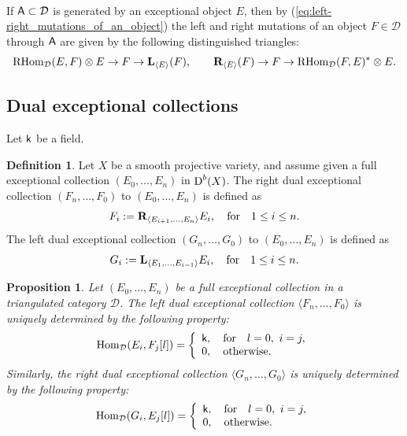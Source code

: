 \documentclass[sn-mathphys-num]{sn-jnl}%
\newcommand{\D}{\mathcal D}
\newcommand*{\Dd}{\mathop{\mathrm D\kern0pt}\nolimits}
\newcommand*{\Hom}{\mathop{\mathrm {Hom}}\nolimits}
\newcommand*{\RHom}{\mathop{\mathrm {RHom}}\nolimits}
\newcommand{\A}{{\sf A}}
\newcommand{\sk}{{\sf k}}
\newtheorem{proposition}[theorem]{Proposition}
\theoremstyle{definition}
\newtheorem{definition}[theorem]{Definition}%
\begin{document}
\

If $\A \subset \D$ is generated by an exceptional object $E$, then by 
 (\ref{eq:left-right_mutations_of_an_object}) the left and right mutations of an object $F\in \D$ through $\A$ are given by the following distinguished triangles:
\begin{equation}
\RHom_\D(E,F)\otimes E\rightarrow F\rightarrow {\bf L}_{\langle E\rangle}(F), \qquad 
{\bf R}_{\langle E\rangle}(F)\rightarrow F\rightarrow \RHom_\D(F,E)^{\ast}\otimes E .
\end{equation}
\subsection{Dual exceptional collections}\label{subsec:dualFEC}
Let $\sk$ be a field.
\begin{definition}\label{def:left-right_dual_exceptional_collections}
Let $X$ be a smooth projective variety, and assume given a full exceptional collection $(E_0,\dots,E_n)$ in $\Dd ^{b}(X)$. The right dual exceptional collection $(F_n,\dots, F_0)$ to $(E_0,\dots,E_n)$ is defined as 
\begin{equation}
F_i: = {\bf R}_{\langle E_{i+1},\dots,E_{n} \rangle}E_i, \quad {\rm for} \quad 1\leq i\leq n.
\end{equation}
The left dual exceptional collection $(G_n,\dots, G_0)$ to $(E_0,\dots,E_n)$ is defined as 
\begin{equation}
G_i: = {\bf L}_{\langle E_{1},\dots,E_{i-1} \rangle}E_i, \quad {\rm for} \quad 1\leq i\leq n.
\end{equation}
\end{definition}


\begin{proposition}\cite[Proposition 2.15]{Ef}\label{prop:dual_exc_coll_characterization}
Let $(E_0,\dots,E_n)$ be a full exceptional collection  in a triangulated category $\D$. The left dual exceptional collection $\langle F_n, \dots, F_0\rangle$ is uniquely determined by the following property:
\begin{equation}
\Hom _{\D}(E_i,F _j[l]) = \left\{
   \begin{array}{l}
    {\sf k}, \quad {\rm for} \quad l=0, \  i=j,\\
    0, \quad {\rm otherwise}. \\
   \end{array}
  \right.
\end{equation}
Similarly, the right dual exceptional collection $\langle G _n,\dots, G _0\rangle $ is uniquely determined by the following property:
\begin{equation}
\Hom _{\D}(G_i,E_j[l]) = \left\{
   \begin{array}{l}
    {\sf k}, \quad {\rm for} \quad l=0, \  i=j,\\
    0, \quad {\rm otherwise}. \\
   \end{array}
  \right.
\end{equation}
\end{proposition}
\end{document}
